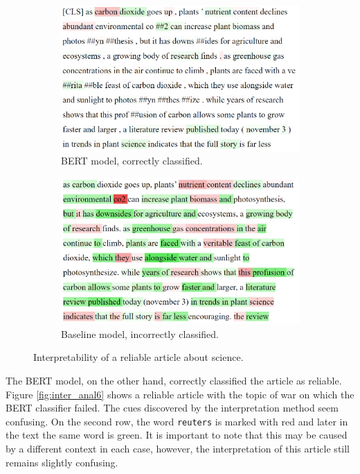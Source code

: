 \begin{figure}[H]
    \centering
    \begin{subfigure}{.5\textwidth}
      \centering
      \includegraphics[width=\linewidth]{obrazky-figures/bert_science.png}
      \caption{BERT model, correctly classified.}
      \label{fig:inter_anal9_a}
    \end{subfigure}%
    \begin{subfigure}{.5\textwidth}
      \centering
      \includegraphics[width=\linewidth]{obrazky-figures/bayes_science.png}
      \caption{Baseline model, incorrectly classified.}
      \label{fig:inter_anal9_b}
    \end{subfigure}
    \caption{Interpretability of a reliable article about science.}
    \label{fig:inter_anal9}
\end{figure}

The BERT model, on the other hand, correctly classified the article as reliable. Figure \ref{fig:inter_anal6} shows a reliable article with the topic of war on which the BERT classifier failed. The cues discovered by the interpretation method seem confusing. On the second row, the word \texttt{reuters} is marked with red and later in the text the same word is green. It is important to note that this may be caused by a different context in each case, however, the interpretation of this article still remains slightly confusing.

